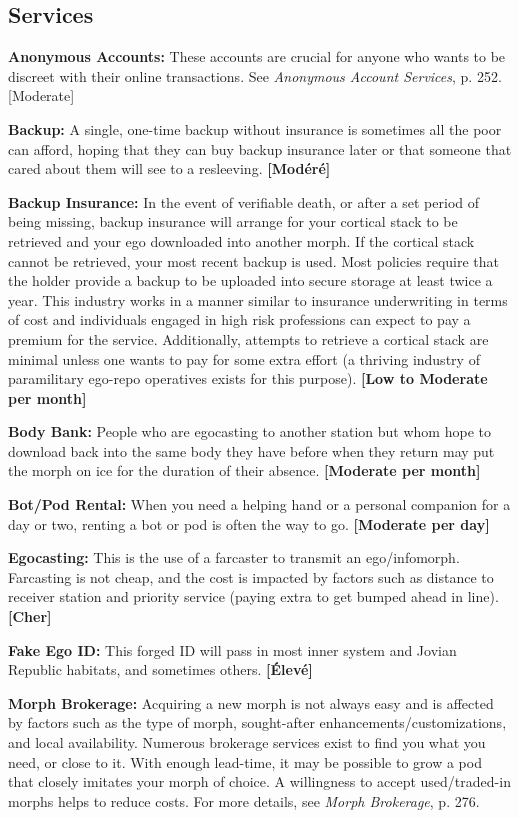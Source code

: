 {{\subsection{Services} \label{sec:services} 

\textbf{Anonymous Accounts:} These accounts are crucial for anyone who wants to be discreet with their online transactions. See \emph{Anonymous Account Services}, p. 252. [Moderate] 

\textbf{Backup:} A single, one-time backup without insurance is sometimes all the poor can afford, hoping that they can buy backup insurance later or that someone that cared about them will see to a resleeving. \textbf{[Modéré]} 

\textbf{Backup Insurance:} In the event of verifiable death, or after a set period of being missing, backup insurance will arrange for your cortical stack to be retrieved and your ego downloaded into another morph. If the cortical stack cannot be retrieved, your most recent backup is used. Most policies require that the holder provide a backup to be uploaded into secure storage at least twice a year. This industry works in a manner similar to insurance underwriting in terms of cost and individuals engaged in high risk professions can expect to pay a premium for the service. Additionally, attempts to retrieve a cortical stack are minimal unless one wants to pay for some extra effort (a thriving industry of paramilitary ego-repo operatives exists for this purpose). \textbf{[Low to Moderate per month]} 

\textbf{Body Bank:} People who are egocasting to another station but whom hope to download back into the same body they have before when they return may put the morph on ice for the duration of their absence. \textbf{[Moderate per month]} 

\textbf{Bot/Pod Rental:} When you need a helping hand or a personal companion for a day or two, renting a bot or pod is often the way to go. \textbf{[Moderate per day]} 

\textbf{Egocasting:} This is the use of a farcaster to transmit an ego/infomorph. Farcasting is not cheap, and the cost is impacted by factors such as distance to receiver station and priority service (paying extra to get bumped ahead in line). \textbf{[Cher]} 

\textbf{Fake Ego ID:} This forged ID will pass in most inner system and Jovian Republic habitats, and sometimes others. \textbf{[Élevé]} 

\textbf{Morph Brokerage:} Acquiring a new morph is not always easy and is affected by factors such as the type of morph, sought-after enhancements/customizations, and local availability. Numerous brokerage services exist to find you what you need, or close to it. With enough lead-time, it may be possible to grow a pod that closely imitates your morph of choice. A willingness to accept used/traded-in morphs helps to reduce costs. For more details, see \emph{Morph Brokerage}, p. 276. 

}}
